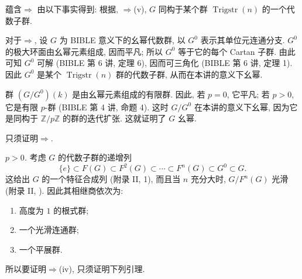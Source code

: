 
蕴含\(\Rightarrow\)
由以下事实得到: 根据,
\(\Rightarrow\)(v),
\(G\) 同构于某个群 \(\operatorname{Trigstr}(n)\) 的一个代数子群.

对于\(\Rightarrow\),
设 \(G\) 为 BIBLE 意义下的幺幂代数群, 以 \(G^0\) 表示其单位元连通分支.
\(G^0\) 的极大环面由幺幂元素组成, 因而平凡; 所以 \(G^0\) 等于它的每个 Cartan 子群.
由此可知 \(G^0\) 可解 (BIBLE 第 6 讲, 定理 6), 因而可三角化 (BIBLE 第 6 讲, 定理 1).
因此 \(G^0\) 是某个 \(\operatorname{Trigstr}(n)\) 群的代数子群,
从而在本讲的意义下幺幂.

群 \((G/G^0)(k)\) 是由幺幂元素组成的有限群.
因此, 若 \(p=0\), 它平凡; 若 \(p>0\), 它是有限 \(p\)-群 (BIBLE 第 4 讲, 命题 4).
这时 \(G/G^0\) 在本讲的意义下幺幂, 因为它是同构于 \(\mathbb Z/p\mathbb Z\) 的群的迭代扩张.
这就证明了 \(G\) 幺幂.

只须证明\(\Rightarrow\).

\smallskip
\noindent\textit{ \(p>0\).}\quad
考虑 \(G\) 的代数子群的递增列
\[
  \{e\}\subset F(G)\subset F^2(G)\subset\cdots\subset
  F^n(G)\subset G^0\subset G.
\]
这给出 \(G\) 的一个特征合成列 (附录 II, 1),
而且当 \(n\) 充分大时, \(G/F^n(G)\) 光滑
(附录 II, ).
因此其相继商依次为:
\begin{enumerate}
\item[(1)] 高度为 \(1\) 的根式群;
\item[(2)] 一个光滑连通群;
\item[(3)] 一个平展群.
\end{enumerate}
所以要证明\(\Rightarrow\)(iv), 只须证明下列引理.

